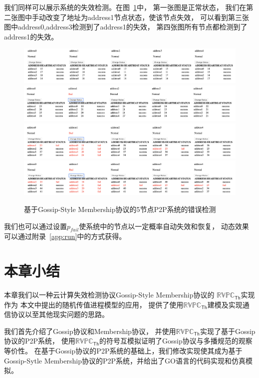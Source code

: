 我们同样可以展示系统的失效检测。在图~\ref{fig:demo_2}中，
第一张图是正常状态，
我们在第二张图中手动改变了地址为address1节点状态，使该节点失效，
可以看到第三张图中address0,address3检测到了address1的失效，
第四张图所有节点都检测到了address1的失效。
 \begin{figure}[!htp]
   \begin{minipage}{0.9\textwidth}
     \centering
     \includegraphics[width=15cm]{../figure/demo/0.png}
     \\
     \includegraphics[width=15cm]{../figure/demo/1.png}
     \\
     \includegraphics[width=15cm]{../figure/demo/2.png}
     \\
     \includegraphics[width=15cm]{../figure/demo/3.png}
   \end{minipage}
   \caption{基于Gossip-Style Membership协议的5节点P2P系统的错误检测}
   \label{fig:demo_2}   
\end{figure}

我们也可以通过设置$p_{fail}$使系统中的节点以一定概率自动失效和恢复，
动态效果可以通过附录~\ref{app:run}中的方式获得。

 \section{本章小结}
 本章我们以一种云计算失效检测协议Gossip-Style Membership协议的
 $\mathbb{RVPC}_{\mathsf{Th}}$实现作为
 本文中提出的随机传值进程模型的应用，
 提供了使用$\mathbb{RVPC}_{\mathsf{Th}}$建模及实现通信协议以至其他现实问题的思路。

 我们首先介绍了Gossip协议和Membership协议，
并使用$\mathbb{RVPC}_{\mathsf{Th}}$实现了基于Gossip协议的P2P系统，
使用$\mathbb{RVPC}_{\mathsf{Th}}$的符号互模拟证明了Gossip协议与多播规范的观察等价性。
在基于Gossip协议的P2P系统的基础上，我们修改实现使其成为基于
Gossip-Sytle Membership协议的P2P系统，并给出了GO语言的代码实现和仿真模拟。

